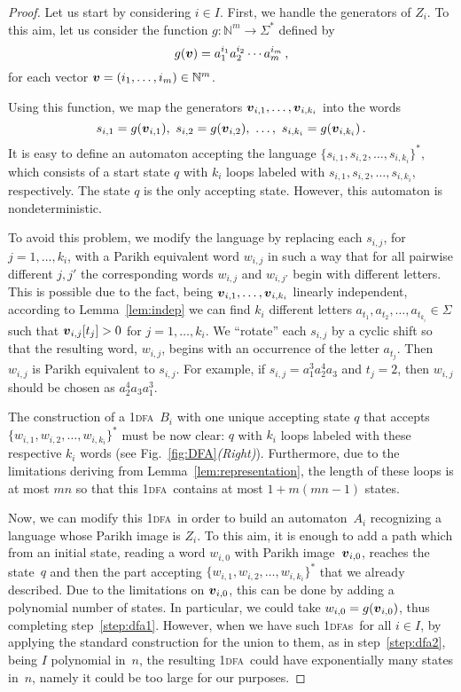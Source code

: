 \documentclass[11pt]{article}
\newcommand*{\ow}{\textsc{1}}
\newcommand*{\owdfa}{\ow\textsc{dfa}}
\newcommand*{\owdfas}{\ow\textsc{dfa}s}
\def\Vec#1{\mbox{\boldmath $#1$}}
\begin{document}
\begin{proof}
Let us start by considering $i\in I$.
First, we handle the generators of $Z_i$. To this aim,
let us consider the function $g: \mathbb{N}^m \to \Sigma^*$ defined by
\[
g(\Vec{v}) = a_1^{i_1} a_2^{i_2} \cdots a_m^{i_m}\,,
\]
for each vector $\Vec{v} = (i_1, \ldots, i_m)\in\mathbb{N}^m$.

Using this function, we map the generators $\Vec{v}_{i, 1}, \ldots, \Vec{v}_{i, k_i}$ into the words 
\[
s_{i, 1}= g(\Vec{v}_{i, 1}),\  s_{i, 2}= g(\Vec{v}_{i, 2}),\ \ldots,\ s_{i, k_i}= g(\Vec{v}_{i, k_i})\,.
\] 
It is easy to define an automaton accepting the language $\{s_{i, 1}, s_{i, 2}, \ldots, s_{i, k_i}\}^*$, which consists of a start state $q$ with $k_i$ loops labeled with $s_{i, 1}, s_{i, 2}, \ldots, s_{i, k_i}$, respectively. 
The state $q$ is the only  accepting state. 
However, this automaton is nondeterministic. 

To avoid this problem, we modify the language by replacing each $s_{i, j}$, for $j = 1, \ldots, k_i$, with a Parikh equivalent word $w_{i, j}$ in such a way that for all pairwise different $j,j'$ the
corresponding words $w_{i, j}$ and $w_{i, j'}$ begin with different letters. 
This is possible due to the fact, being $\Vec{v}_{i, 1}, \ldots, \Vec{v}_{i, k_i}$ linearly independent,
according to Lemma~\ref{lem:indep} we can find $k_i$ different letters 
$a_{t_1}, a_{t_2}, \ldots, a_{t_{k_i}} \in \Sigma$ such that $\Vec{v}_{i, j}[t_j] > 0$ for $j = 1, \ldots, k_i$.
We ``rotate'' each $s_{i, j}$ by a cyclic shift so that the resulting word, $w_{i, j}$, begins with an occurrence of the letter $a_{t_j}$. 
Then $w_{i, j}$ is Parikh equivalent to $s_{i, j}$. 
For example, if $s_{i, j} = a_1^3 a_2^4 a_3$ and $t_j = 2$, then $w_{i, j}$ should be chosen as $a_2^4 a_3 a_1^3$. 

The construction of a \owdfa\ $B_i$ with one unique accepting state $q$ that accepts $\{w_{i, 1}, w_{i, 2}, \ldots, w_{i, k_i}\}^*$ must be now clear: $q$ with $k_i$ loops labeled with these respective $k_i$ words 
(see Fig.~\ref{fig:DFA}\emph{(Right)}). 
Furthermore, due to the limitations deriving {}from Lemma~\ref{lem:representation}, 
the length of these loops is at most $mn$ so that this \owdfa\ contains at most $1+m(mn-1)$ states. 

\smallskip
Now, we can modify this \owdfa\ in order to build an automaton~$A_i$ recognizing a language whose Parikh image is $Z_i$.
To this aim, it is enough to add a path which from an initial state, reading a word $w_{i, 0}$ with Parikh
image~$\Vec{v}_{i, 0}$, reaches the state~$q$ and then the part accepting $\{w_{i, 1}, w_{i, 2}, \ldots, w_{i, k_i}\}^*$
that we already described.
Due to the limitations on $\Vec{v}_{i, 0}$, this can be done by adding a polynomial number of states.
In particular, we could take $w_{i, 0}=g(\Vec{v}_{i, 0})$, thus completing step~\ref{step:dfa1}.
However, when we have such \owdfas\ for all $i\in I$, by applying the standard construction for the union to them, 
as in step~\ref{step:dfa2}, being $I$
polynomial in~$n$, the resulting \owdfa\ could have exponentially many states in~$n$, namely it could be too large
for our purposes.


\end{proof}
\end{document}
